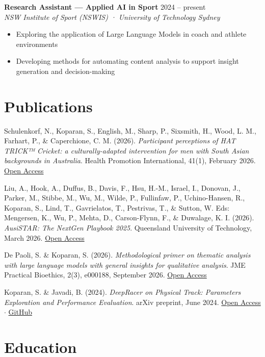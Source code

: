 \documentclass[11pt, a4paper]{article}
\begin{document}
\vspace{0.5em}

\textbf{Research Assistant — Applied AI in Sport} \hfill 2024 – present\\
\textit{NSW Institute of Sport (NSWIS) · University of Technology Sydney}
\begin{itemize}
  \item Exploring the application of Large Language Models in coach and athlete environments
  \item Developing methods for automating content analysis to support insight generation and decision-making
\end{itemize}

\section*{Publications}

Schulenkorf, N., Koparan, S., English, M., Sharp, P., Sixsmith, H., Wood, L. M., Farhart, P., \& Caperchione, C. M. (2026). \textit{Participant perceptions of HAT TRICK™ Cricket: a culturally-adapted intervention for men with South Asian backgrounds in Australia}. Health Promotion International, 41(1), February 2026. \href{https://doi.org/10.1093/heapro/daag001}{Open Access}

Liu, A., Hook, A., Duffus, B., Davis, F., Hsu, H.-M., Israel, I., Donovan, J., Parker, M., Stibbe, M., Wu, M., Wilde, P., Fullinfaw, P., Uchino-Hansen, R., Koparan, S., Lind, T., Gavrielatos, T., Pestrivas, T., \& Sutton, W. Eds: Mengersen, K., Wu, P., Mehta, D., Carson-Flynn, F., \& Duwalage, K. I. (2026). \textit{AusiSTAR: The NextGen Playbook 2025}. Queensland University of Technology, March 2026. \href{https://qut.pressbooks.pub/ausistar-nextgen-playbook-2025/}{Open Access}

De Paoli, S. \& Koparan, S. (2026). \textit{Methodological primer on thematic analysis with large language models with general insights for qualitative analysis}. JME Practical Bioethics, 2(3), e000188, September 2026. \href{https://doi.org/10.1136/jmepb-2026-000188}{Open Access}

Koparan, S. \& Javadi, B. (2024). \textit{DeepRacer on Physical Track: Parameters Exploration and Performance Evaluation}. arXiv preprint, June 2024. \href{https://arxiv.org/abs/2406.03769}{Open Access} $\cdot$ \href{https://github.com/SDC-Lab/DeepRacer-Models}{GitHub}

\section*{Education}
\end{document}
